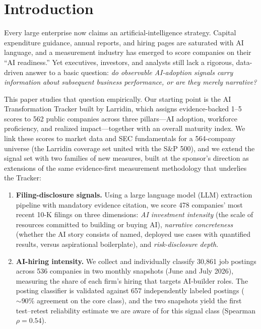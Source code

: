 \documentclass[11pt]{article}
\begin{document}
\section{Introduction}

Every large enterprise now claims an artificial-intelligence strategy. Capital
expenditure guidance, annual reports, and hiring pages are saturated with AI
language, and a measurement industry has emerged to score companies on their
``AI readiness.'' Yet executives, investors, and analysts still lack a rigorous,
data-driven answer to a basic question: \emph{do observable AI-adoption signals
carry information about subsequent business performance, or are they merely
narrative?}

This paper studies that question empirically. Our starting point is the AI
Transformation Tracker built by Larridin, which assigns evidence-backed
1--5 scores to 562 public companies across three pillars---AI adoption,
workforce proficiency, and realized impact---together with an overall maturity
index. We link these scores to market data and SEC fundamentals for a
564-company universe (the Larridin coverage set united with the S\&P 500), and
we extend the signal set with two families of new measures, built at the
sponsor's direction as extensions of the same evidence-first measurement
methodology that underlies the Tracker:

\begin{enumerate}
  \item \textbf{Filing-disclosure signals.} Using a large language model (LLM)
  extraction pipeline with mandatory evidence citation, we score 478 companies'
  most recent 10-K filings on three dimensions: \emph{AI investment intensity}
  (the scale of resources committed to building or buying AI),
  \emph{narrative concreteness} (whether the AI story consists of named,
  deployed use cases with quantified results, versus aspirational boilerplate),
  and \emph{risk-disclosure depth}.
  \item \textbf{AI-hiring intensity.} We collect and individually classify
  30{,}861 job postings across 536 companies in two monthly snapshots
  (June and July 2026), measuring the share of each firm's hiring that targets
  AI-builder roles. The posting classifier is validated against 657
  independently labeled postings (${\sim}90\%$ agreement on the core class),
  and the two snapshots yield the first test--retest reliability estimate we
  are aware of for this signal class (Spearman $\rho = 0.54$).
\end{enumerate}
\end{document}
